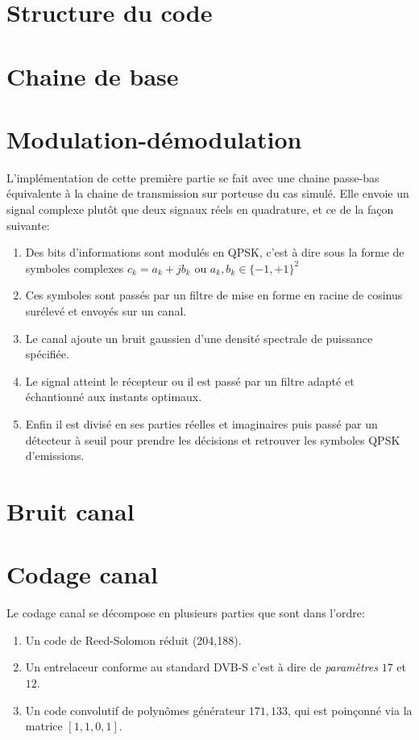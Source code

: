 \documentclass[a4paper,11pt]{article}
\begin{document}
\section{Structure du code}

\section{Chaine de base}

\section{Modulation-démodulation}
L'implémentation de cette première partie se fait avec une chaine passe-bas équivalente à la chaine de transmission sur porteuse du cas simulé. Elle envoie un signal complexe plutôt que deux signaux réels en quadrature, et ce de la façon suivante:
\begin{enumerate}
	\item Des bits d'informations sont modulés en QPSK, c'est à dire sous la forme de symboles complexes $c_k=a_k+jb_k$ ou $a_k,b_k \in \{-1,+1\}^2$
	\item Ces symboles sont passés par un filtre de mise en forme en racine de cosinus surélevé et envoyés sur un canal.
	\item Le canal ajoute un bruit gaussien d'une densité spectrale de puissance spécifiée.
	\item Le signal atteint le récepteur ou il est passé par un filtre adapté et échantionné aux instants optimaux.
	\item Enfin il est divisé en ses parties réelles et imaginaires puis passé par un détecteur à seuil pour prendre les décisions et retrouver les symboles QPSK d'emissions.
\end{enumerate}

\section{Bruit canal}

\section{Codage canal}
Le codage canal se décompose en plusieurs parties que sont dans l'ordre:
\begin{enumerate}
	\item Un code de Reed-Solomon réduit (204,188).
	\item Un entrelaceur conforme au standard DVB-S c'est à dire de \emph{paramètres} $17$ et $12$.
	\item Un code convolutif de polynômes générateur $171, 133$, qui est poinçonné via la matrice $[1,1,0,1]$.
\end{enumerate}
\end{document}
